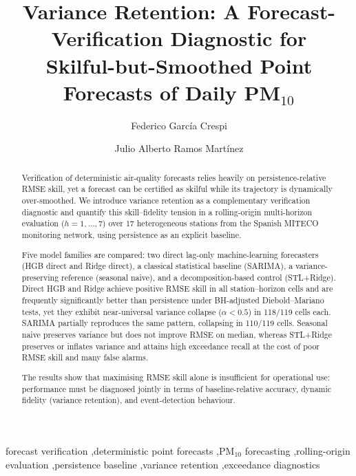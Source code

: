 \documentclass[3p,times,single-column]{elsarticle}
\begin{document}
\begin{frontmatter}

\title{Variance Retention: A Forecast-Verification Diagnostic for\\Skilful-but-Smoothed Point Forecasts of Daily PM$_{10}$}

\author[1]{Federico Garc\'ia Crespi}

\author[2]{Julio Alberto Ramos Mart\'inez}


\begin{abstract}
Verification of deterministic air-quality forecasts relies heavily on persistence-relative RMSE skill, yet a forecast can be certified as skilful while its trajectory is dynamically over-smoothed. We introduce variance retention as a complementary verification diagnostic and quantify this skill--fidelity tension in a rolling-origin multi-horizon evaluation ($h=1,\ldots,7$) over 17 heterogeneous stations from the Spanish MITECO monitoring network, using persistence as an explicit baseline.

Five model families are compared: two direct lag-only machine-learning forecasters (HGB direct and Ridge direct), a classical statistical baseline (SARIMA), a variance-preserving reference (seasonal naive), and a decomposition-based control (STL+Ridge). Direct HGB and Ridge achieve positive RMSE skill in all station--horizon cells and are frequently significantly better than persistence under BH-adjusted Diebold--Mariano tests, yet they exhibit near-universal variance collapse ($\alpha<0.5$) in 118/119 cells each. SARIMA partially reproduces the same pattern, collapsing in 110/119 cells. Seasonal naive preserves variance but does not improve RMSE on median, whereas STL+Ridge preserves or inflates variance and attains high exceedance recall at the cost of poor RMSE skill and many false alarms.

The results show that maximising RMSE skill alone is insufficient for operational use: performance must be diagnosed jointly in terms of baseline-relative accuracy, dynamic fidelity (variance retention), and event-detection behaviour.
\end{abstract}

\begin{keyword}
forecast verification \sep deterministic point forecasts \sep PM$_{10}$ forecasting \sep rolling-origin evaluation \sep persistence baseline \sep variance retention \sep exceedance diagnostics
\end{keyword}

\end{frontmatter}
\end{document}
